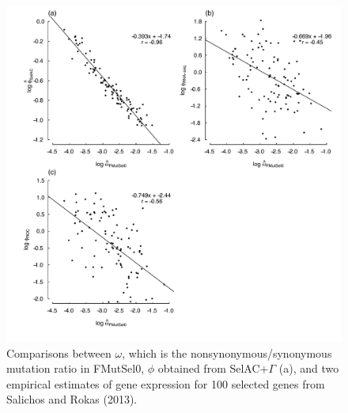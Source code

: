 \documentclass{article}
\begin{document}
\begin{figure}[H]
  \centering
  \includegraphics[width=0.9\linewidth]{FIGURE_2_MutSelOmega_vs_Us_ROC_Scer_only.pdf}
  \caption{Comparisons between $\omega$, which is the nonsynonymous/synonymous mutation ratio in FMutSel0, $\phi$ obtained from SelAC+$\Gamma$ (a), and two empirical estimates of gene expression for 100 selected genes from Salichos and Rokas (2013).  
  } 
  \label{fig:OmegavsPhi}
\end{figure}
\end{document}

